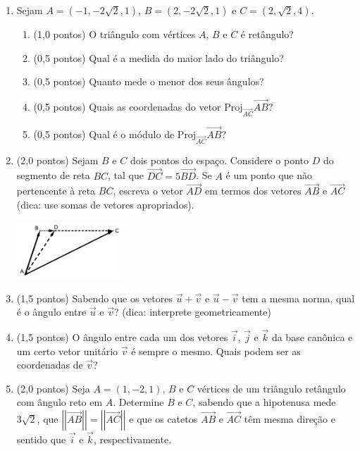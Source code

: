 \documentclass[12pt,a4paper]{article}
\newcommand{\vect}[1]{\overrightarrow{#1}}
\newcommand{\norm}[1]{\left|\left|{#1}\right|\right|}
\begin{document}
\begin{enumerate}
\item Sejam $A = (-1, -2\sqrt{2}, 1)$, $B = (2, -2\sqrt{2}, 1)$ e $C = (2, \sqrt{2}, 4)$.
\begin{enumerate}
\item (1,0 pontos) O triângulo com vértices $A$, $B$ e $C$ é retângulo?
\item (0,5 pontos) Qual é a medida do maior lado do triângulo?
\item (0,5 pontos) Quanto mede o menor dos seus ângulos?
\item (0,5 pontos) Quais as coordenadas do vetor $\text{Proj}_{\vect{AC}}\vect{AB}$?
\item (0,5 pontos) Qual é o módulo de $\text{Proj}_{\vect{AC}}\vect{AB}$?
\end{enumerate}

\item (2,0 pontos) Sejam $B$ e $C$ dois pontos do espaço. Considere o ponto $D$ do segmento de reta $BC$, tal que $\vect{DC} = 5 \vect{BD}$. Se $A$ é um ponto que não pertencente à reta $BC$, escreva o vetor $\vect{AD}$ em termos dos vetores $\vect{AB}$ e $\vect{AC}$ (dica: use somas de vetores apropriados).

\includegraphics[width=4.0cm]{img/prova-1-pro-fig1}

\item (1,5 pontos) Sabendo que os vetores $\vec{u} + \vec{v}$ e $\vec{u} - \vec{v}$ tem a mesma norma, qual é o ângulo entre $\vec{u}$ e $\vec{v}$? (dica: interprete geometricamente)
\item (1,5 pontos) O ângulo entre cada um dos vetores $\vec{i}$, $\vec{j}$ e $\vec{k}$ da base canônica e um certo vetor unitário $\vec{v}$ é sempre o mesmo. Quais podem ser as coordenadas de $\vec{v}$?
\item (2,0 pontos) Seja $A=(1,-2,1)$, $B$ e $C$ vértices de um triângulo retângulo com ângulo reto em $A$. Determine $B$ e $C$, sabendo que a hipotenusa mede $3\sqrt{2}$, que $\norm{\vect{AB}} = \norm{\vect{AC}}$ e que os catetos $\vect{AB}$ e $\vect{AC}$ têm mesma direção e sentido que $\vec{i}$ e $\vec{k}$, respectivamente.
\end{enumerate}
\end{document}
